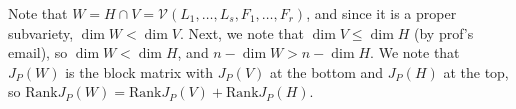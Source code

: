 \documentclass[11pt]{book}
\begin{document}
\begin{problem}
Note that $W=H\cap V=\mathcal{V}(L_1,\dots,L_s,F_1,\dots,F_r)$, and since it is a proper subvariety, $\dim W<\dim V$. Next, we note that $\dim V\le \dim H$ (by prof's email), so $\dim W<\dim H$, and $n-\dim W>n-\dim H$. We note that $J_P(W)$ is the block matrix with $J_P(V)$ at the bottom and $J_P(H)$ at the top, so $\mathrm{Rank}J_P(W)=\mathrm{Rank}J_P(V)+\mathrm{Rank}J_P(H)$. 
\end{problem}
\end{document}
